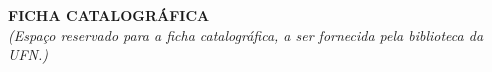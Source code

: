 %

\begin{fichacatalografica}
    \vspace*{\fill}
    \begin{center}
        \textbf{FICHA CATALOGRÁFICA}\\[1em]
        \textit{(Espaço reservado para a ficha catalográfica, a ser
        fornecida pela biblioteca da UFN.)}
    \end{center}


    \vspace*{\fill}
\end{fichacatalografica}
